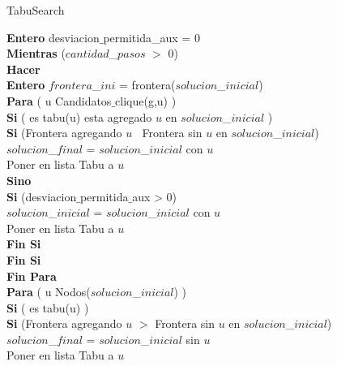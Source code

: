 


\begin{algorithm}[H]
    \SetAlgoLined
    \caption{TabuSearch}
		
		\textbf{Entero} desviacion$\_$permitida_aux = 0 \\
		
		\textbf{Mientras} ($cantidad$\_$pasos$ $>$ 0) \\
		     \textbf{Hacer} \\
							\textbf{Entero} $frontera$\_$ini$ = frontera($solucion$\_$inicial$) \\
							
							\textbf{Para} ( u \in Candidatos$\_$clique(g,u) ) \\
							       \textbf{Si} ( \neg es tabu(u) \wedge \neg esta agregado $u$ en $solucion$\_$inicial$ ) \\
				                         \textbf{Si} (Frontera agregando $u$ $\>$ Frontera sin $u$ en $solucion$\_$inicial$) \\
																              $solucion$\_$final$ = $solucion$\_$inicial$ con $u$ \\
																							Poner en lista Tabu a $u$ \\
																 \textbf{Sino} \\
																              \textbf{Si} (desviacion$\_$permitida$\_$aux > 0) \\
																							          $solucion$\_$inicial$ = $solucion$\_$inicial$ con $u$ \\
																												Poner en lista Tabu a $u$ \\
																 \textbf{Fin Si} \\
										 \textbf{Fin Si} \\
							\textbf{Fin Para} \\
							\textbf{Para} ( u \in Nodos($solucion$\_$inicial$) ) \\
							       \textbf{Si} ( \neg es tabu(u) ) \\
				                         \textbf{Si }(Frontera agregando $u$ $>$ Frontera sin $u$ en $solucion$\_$inicial$) \\
																              $solucion$\_$final$ = $solucion$\_$inicial$ sin $u$ \\
																							Poner en lista Tabu a $u$ \\

\end{algorithm}
